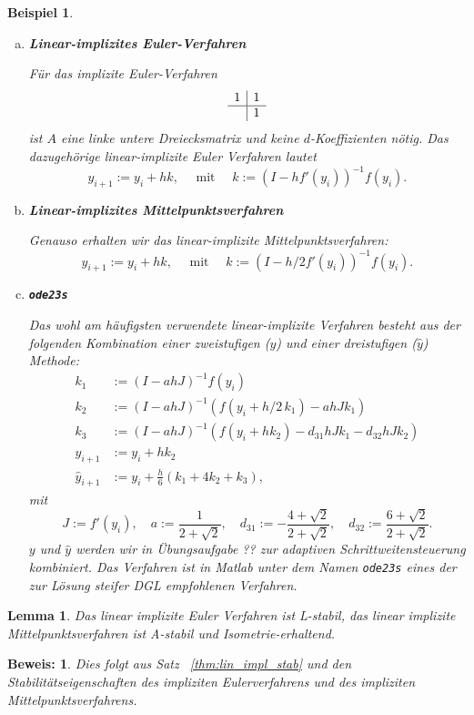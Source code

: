 \documentclass[
]{mycourse}
\theoremstyle{mythm}
\newtheorem{lemma}[theorem]{Lemma}
\newtheorem{beispiel}[theorem]{Beispiel}
\theoremstyle{break}
\newtheorem*{beweis}{Beweis:}
\begin{document}
\begin{beispiel}\label{bsp:lin_impl}
\begin{enumerate}[(a)]
\item {\bf Linear-implizites Euler-Verfahren}

Für das implizite Euler-Verfahren
\[
\begin{array}{c | c}
1 & 1 \\ \hline 
& 1
\end{array}
\]
ist $A$ eine linke untere Dreiecksmatrix und keine $d$-Koeffizienten nötig. Das dazugehörige \emph{linear-implizite Euler Verfahren} lautet
\[
y_{i+1}:=y_i+hk, \quad \mbox{ mit } \quad k:=(I-hf'(y_i))^{-1} f(y_i).
\]
\item {\bf Linear-implizites Mittelpunktsverfahren}

Genauso erhalten wir das \emph{linear-implizite Mittelpunktsverfahren}:
\[
y_{i+1}:=y_i+hk, \quad \mbox{ mit } \quad k:=(I-h/2 f'(y_i))^{-1} f(y_i).
\]
 
\item  {\bf\tt ode23s} 

Das wohl am häufigsten verwendete linear-implizite Verfahren besteht aus der folgenden Kombination 
einer zweistufigen ($y$) und einer dreistufigen ($\hat y$) Methode:
\begin{align*}
k_1&:=(I-ahJ)^{-1} f(y_i)\\
k_2&:=(I-ahJ)^{-1} \left( f(y_i+h/2\, k_1)-ahJk_1\right)\\
k_3&:=(I-ahJ)^{-1} \left( f(y_i+h k_2)-d_{31}hJk_1 - d_{32} hJk_2 \right)\\[+1ex]
y_{i+1}&:=y_i+hk_2\\
\hat y_{i+1}&:=y_i+\frac{h}{6} (k_1+4 k_2 + k_3),
\end{align*}
mit
\[
J:=f'(y_i), \quad a:=\frac{1}{2+\sqrt{2}}, \quad d_{31}:=-\frac{4+\sqrt{2}}{2+\sqrt{2}}, \quad d_{32}:=\frac{6+\sqrt{2}}{2+\sqrt{2}}.
\]
$y$ und $\hat y$ werden wir in Übungsaufgabe ?? zur adaptiven Schrittweitensteuerung kombiniert. 
Das Verfahren ist in Matlab unter dem Namen {\tt ode23s} eines der zur Lösung steifer DGL empfohlenen Verfahren.
\end{enumerate}
\end{beispiel}


\begin{lemma}\label{lemma:stab_lin_impl}
Das linear implizite Euler Verfahren ist L-stabil, das linear implizite Mittelpunktsverfahren ist A-stabil und
Isometrie-erhaltend.
\end{lemma}
\begin{beweis}
Dies folgt aus Satz ~\ref{thm:lin_impl_stab} und den Stabilitätseigenschaften des impliziten Eulerverfahrens und
des impliziten Mittelpunktsverfahrens.
\end{beweis}
\end{document}
